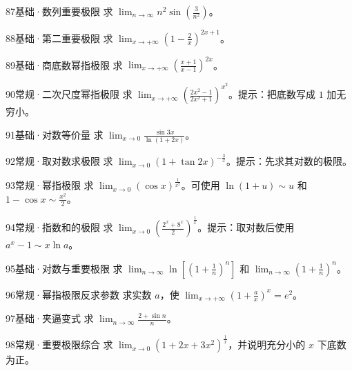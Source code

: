 \begin{exercise}{87}{基础·数列重要极限}
求 $\lim_{n\to\infty}n^2\sin(\frac{3}{n^2})$。
\end{exercise}
\begin{exercise}{88}{基础·第二重要极限}
求 $\lim_{x\to+\infty}(1-\frac{2}{x})^{2x+1}$。
\end{exercise}
\begin{exercise}{89}{基础·商底数幂指极限}
求 $\lim_{x\to+\infty}\left(\frac{x+1}{x-1}\right)^{2x}$。
\end{exercise}
\begin{exercise}{90}{常规·二次尺度幂指极限}
求 $\lim_{x\to+\infty}\left(\frac{2x^2-1}{2x^2+1}\right)^{x^2}$。提示：把底数写成 $1$ 加无穷小。
\end{exercise}
\begin{exercise}{91}{基础·对数等价量}
求 $\lim_{x\to0}\frac{\sin3x}{\ln(1+2x)}$。
\end{exercise}
\begin{exercise}{92}{常规·取对数求极限}
求 $\lim_{x\to0}(1+\tan2x)^{-\frac{3}{x}}$。提示：先求其对数的极限。
\end{exercise}
\begin{exercise}{93}{常规·幂指极限}
求 $\lim_{x\to0}(\cos x)^{\frac{1}{x^2}}$。可使用 $\ln(1+u)\sim u$ 和 $1-\cos x\sim\frac{x^2}{2}$。
\end{exercise}
\begin{exercise}{94}{常规·指数和的极限}
求 $\lim_{x\to0}\left(\frac{2^x+8^x}{2}\right)^{\frac{1}{x}}$。提示：取对数后使用 $a^x-1\sim x\ln a$。
\end{exercise}
\begin{exercise}{95}{基础·对数与重要极限}
求 $\lim_{n\to\infty}\ln[(1+\frac{1}{n})^n]$ 和 $\lim_{n\to\infty}(1+\frac{1}{n})^n$。
\end{exercise}
\begin{exercise}{96}{常规·幂指极限反求参数}
求实数 $a$，使 $\lim_{x\to+\infty}(1+\frac{a}{x})^x=e^2$。
\end{exercise}
\begin{exercise}{97}{基础·夹逼变式}
求 $\lim_{n\to\infty}\frac{2+\sin n}{n}$。
\end{exercise}
\begin{exercise}{98}{常规·重要极限综合}
求 $\lim_{x\to0}(1+2x+3x^2)^{\frac{1}{x}}$，并说明充分小的 $x$ 下底数为正。
\end{exercise}
